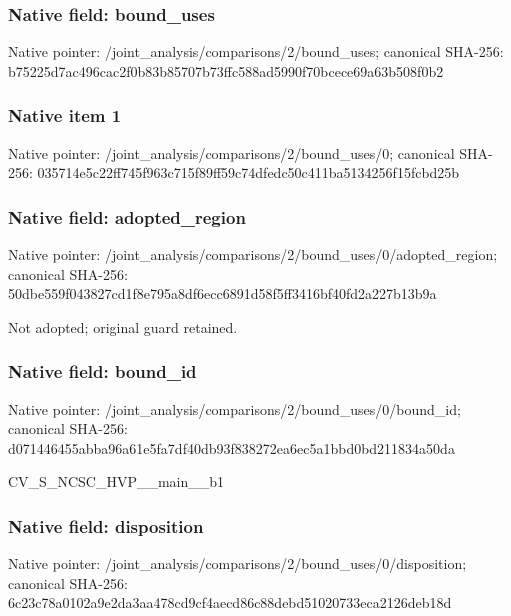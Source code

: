 \documentclass[10pt,a4paper]{article}
\begin{document}
\subsubsection{Native field: bound\_\allowbreak{}uses}
Native pointer: /joint\_\allowbreak{}analysis/comparisons/2/bound\_\allowbreak{}uses; canonical SHA-256: b75225d7ac496cac2f0b83b85707b73ffc588ad5990f70bcece69a63b508f0b2

\subsubsection{Native item 1}
Native pointer: /joint\_\allowbreak{}analysis/comparisons/2/bound\_\allowbreak{}uses/0; canonical SHA-256: 035714e5c22ff745f963c715f89ff59c74dfedc50c411ba5134256f15fcbd25b

\subsubsection{Native field: adopted\_\allowbreak{}region}
Native pointer: /joint\_\allowbreak{}analysis/comparisons/2/bound\_\allowbreak{}uses/0/adopted\_\allowbreak{}region; canonical SHA-256: 50dbe559f043827cd1f8e795a8df6ecc6891d58f5ff3416bf40fd2a227b13b9a

\begingroup\raggedright\sloppy Not adopted;\allowbreak{} original guard retained.\par\endgroup

\subsubsection{Native field: bound\_\allowbreak{}id}
Native pointer: /joint\_\allowbreak{}analysis/comparisons/2/bound\_\allowbreak{}uses/0/bound\_\allowbreak{}id; canonical SHA-256: d071446455abba96a61e5fa7df40db93f838272ea6ec5a1bbd0bd211834a50da

\begingroup\raggedright\sloppy CV\_\allowbreak{}S\_\allowbreak{}NCSC\_\allowbreak{}HVP\_\allowbreak{}\_\allowbreak{}main\_\allowbreak{}\_\allowbreak{}b1\par\endgroup

\subsubsection{Native field: disposition}
Native pointer: /joint\_\allowbreak{}analysis/comparisons/2/bound\_\allowbreak{}uses/0/disposition; canonical SHA-256: 6c23c78a0102a9e2da3aa478cd9cf4aecd86c88debd51020733eca2126deb18d
\end{document}
